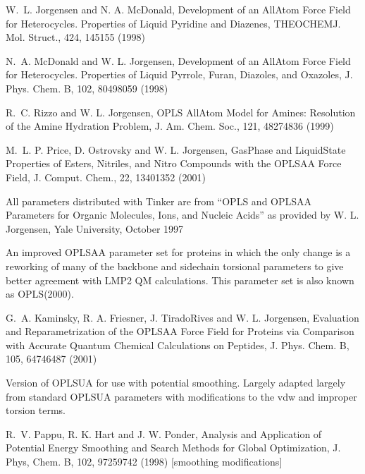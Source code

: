 \documentclass[letterpaper,11pt,english]{sphinxmanual}
\begin{document}
W. L. Jorgensen and N. A. McDonald, Development of an All\sphinxhyphen{}Atom Force Field for Heterocycles. Properties of Liquid Pyridine and Diazenes, THEOCHEM\sphinxhyphen{}J. Mol. Struct., 424, 145\sphinxhyphen{}155 (1998)

N. A. McDonald and W. L. Jorgensen, Development of an All\sphinxhyphen{}Atom Force Field for Heterocycles. Properties of Liquid Pyrrole, Furan, Diazoles, and Oxazoles, J. Phys. Chem. B, 102, 8049\sphinxhyphen{}8059 (1998)

R. C. Rizzo and W. L. Jorgensen, OPLS All\sphinxhyphen{}Atom Model for Amines: Resolution of the Amine Hydration Problem, J. Am. Chem. Soc., 121, 4827\sphinxhyphen{}4836 (1999)

M. L. P. Price, D. Ostrovsky and W. L. Jorgensen, Gas\sphinxhyphen{}Phase and Liquid\sphinxhyphen{}State Properties of Esters, Nitriles, and Nitro Compounds with the OPLS\sphinxhyphen{}AA Force Field, J. Comput. Chem., 22, 1340\sphinxhyphen{}1352 (2001)

All parameters distributed with Tinker are from “OPLS and OPLS\sphinxhyphen{}AA Parameters for Organic Molecules, Ions, and Nucleic Acids” as provided by W. L. Jorgensen, Yale University, October 1997


An improved OPLS\sphinxhyphen{}AA parameter set for proteins in which the only change is a reworking of many of the backbone and sidechain torsional parameters to give better agreement with LMP2 QM calculations. This parameter set is also known as OPLS(2000).

G. A. Kaminsky, R. A. Friesner, J. Tirado\sphinxhyphen{}Rives and W. L. Jorgensen, Evaluation and Reparametrization of the OPLS\sphinxhyphen{}AA Force Field for Proteins via Comparison with Accurate Quantum Chemical Calculations on Peptides, J. Phys. Chem. B, 105, 6474\sphinxhyphen{}6487 (2001)


Version of OPLS\sphinxhyphen{}UA for use with potential smoothing. Largely adapted largely from standard OPLS\sphinxhyphen{}UA parameters with modifications to the vdw and improper torsion terms.

R. V. Pappu, R. K. Hart and J. W. Ponder, Analysis and Application of Potential Energy Smoothing and Search Methods for Global Optimization, J. Phys, Chem. B, 102, 9725\sphinxhyphen{}9742 (1998)  {[}smoothing modifications{]}

\end{document}
